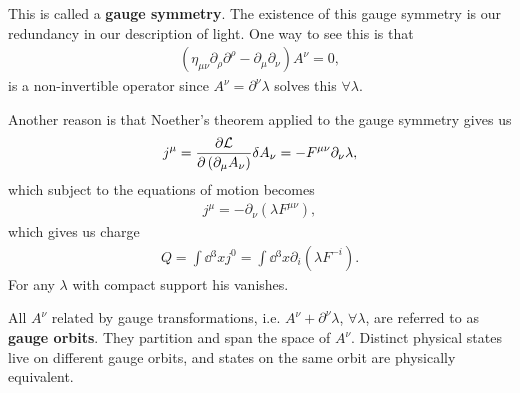 This is called a \textbf{gauge symmetry}. The existence of this gauge symmetry is our redundancy in our description of light. One way to see this is that
\begin{align}
    \left( \eta_{\mu \nu} \partial_\rho \partial^{\rho} - \partial_\mu \partial_\nu \right)  A^{\nu} = 0
,\end{align}
is a non-invertible operator since $A^{\nu} = \partial^{\nu} \lambda$ solves this $\forall \lambda$.

Another reason is that Noether's theorem applied to the gauge symmetry gives us
\begin{align}
    j^{\mu} = \pdv{\mathcal{L}}{\left( \partial_\mu A_\nu \right) } \delta A_\nu = -F^{\mu \nu} \partial_\nu \lambda
,\end{align}
which subject to the equations of motion becomes
\begin{align}
    j^{\mu} = -\partial_{\nu} \left( \lambda F^{\mu \nu}\right) 
,\end{align}
which gives us charge
\begin{align}
    Q = \int \dd{^3x} j^{0} = \int \dd{^3x} \partial_i \left( \lambda F^{-i} \right) 
.\end{align}
For any $\lambda$ with compact support his vanishes.

All $A^{\nu}$ related by gauge transformations, i.e. $A^{\nu} + \partial^{\nu} \lambda$, $\forall \lambda$, are referred to as \textbf{gauge orbits}. They partition and span the space of $A^{\nu}$. Distinct physical states live on different gauge orbits, and states on the same orbit are physically equivalent.


